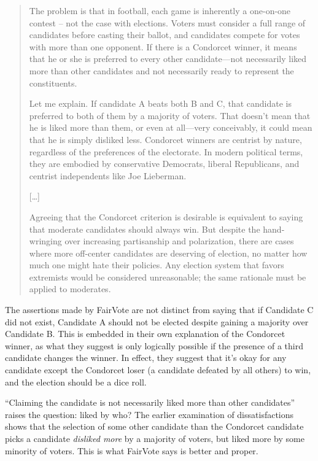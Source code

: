 \begin{quotation}
    The problem is that in football, each game is inherently a one-on-one contest – not the case with elections.  Voters must consider a full range of candidates before casting their ballot, and candidates compete for votes with more than one opponent. If there is a Condorcet winner, it means that he or she is preferred to every other candidate—not necessarily liked more than other candidates and not necessarily ready to represent the constituents.

    Let me explain. If candidate A beats both B and C, that candidate is preferred to both of them by a majority of voters. That doesn’t mean that he is liked more than them, or even at all—very conceivably, it could mean that he is simply disliked less. Condorcet winners are centrist by nature, regardless of the preferences of the electorate. In modern political terms, they are embodied by conservative Democrats, liberal Republicans, and centrist independents like Joe Lieberman.

    […]

    Agreeing that the Condorcet criterion is desirable is equivalent to saying that moderate candidates should always win. But despite the hand-wringing over increasing partisanship and polarization, there are cases where more off-center candidates are deserving of election, no matter how much one might hate their policies. Any election system that favors extremists would be considered unreasonable; the same rationale must be applied to moderates.

\end{quotation}

The assertions made by FairVote are not distinct from saying that if Candidate C did not exist, Candidate A should not be elected despite gaining a majority over Candidate B.  This is embedded in their own explanation of the Condorcet winner, as what they suggest is only logically possible if the presence of a third candidate changes the winner.  In effect, they suggest that it's okay for any candidate except the Condorcet loser (a candidate defeated by all others) to win, and the election should be a dice roll.

``Claiming the candidate is not necessarily liked more than other candidates'' raises the question:  liked by who?  The earlier examination of dissatisfactions shows that the selection of some other candidate than the Condorcet candidate picks a candidate \textit{disliked more} by a majority of voters, but liked more by some minority of voters.  This is what FairVote says is better and proper.

